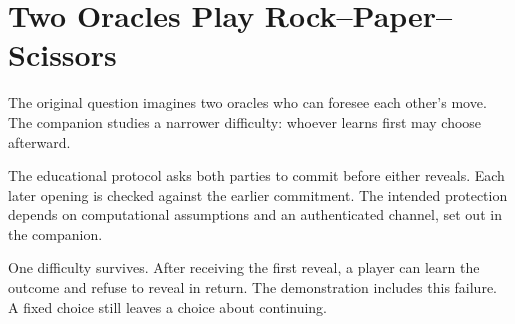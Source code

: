 \chapter{Two Oracles Play Rock--Paper--Scissors}
\label{short:rock-paper-scissors}

The original question imagines two oracles who can foresee each other's
move. The companion studies a narrower difficulty: whoever learns first may
choose afterward.

The educational protocol asks both parties to commit before either reveals.
Each later opening is checked against the earlier commitment. The intended
protection depends on computational assumptions and an authenticated channel,
set out in the companion.

One difficulty survives. After receiving the first reveal, a player can learn
the outcome and refuse to reveal in return. The demonstration includes this
failure. A fixed choice still leaves a choice about continuing.

